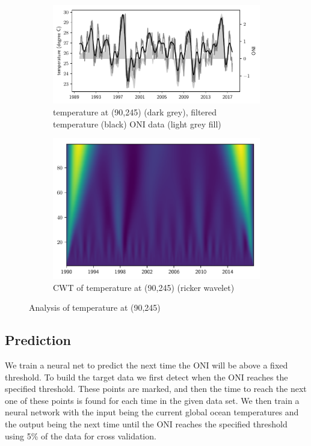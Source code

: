 \documentclass[10pt]{article}
\begin{document}
\begin{figure}[h]\centering
\begin{subfigure}{.45\textwidth}\centering
    \includegraphics[width=\textwidth]{img/el_nino_filtered.pdf}
    \caption{temperature at (90,245) (dark grey), filtered temperature (black) ONI data (light grey fill)}
\end{subfigure}\hfill
\begin{subfigure}{.45\textwidth}\centering
    \includegraphics[width=\textwidth]{img/el_nino_wavelet_transform.pdf}
    \caption{CWT of temperature at (90,245) (ricker wavelet)}
\end{subfigure}
\caption{Analysis of temperature at (90,245)}
\label{elnino}
\end{figure}

\subsection{Prediction}
We train a neural net to predict the next time the ONI will be above a fixed threshold. To build the target data we first detect when the ONI reaches the specified threshold. These points are marked, and then the time to reach the next one of these points is found for each time in the given data set. We then train a neural network with the input being the current global ocean temperatures and the output being the next time until the ONI reaches the specified threshold using 5\% of the data for cross validation.
\end{document}
